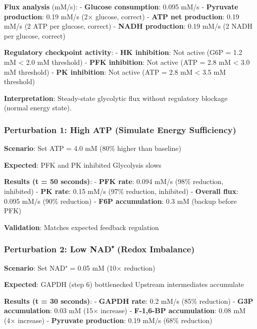 \textbf{Flux analysis} (mM/s): - \textbf{Glucose consumption}: 0.095
mM/s - \textbf{Pyruvate production}: 0.19 mM/s (2× glucose, correct) -
\textbf{ATP net production}: 0.19 mM/s (2 ATP per glucose, correct) -
\textbf{NADH production}: 0.19 mM/s (2 NADH per glucose, correct)

\textbf{Regulatory checkpoint activity}: - \textbf{HK inhibition}: Not
active (G6P = 1.2 mM \textless{} 2.0 mM threshold) - \textbf{PFK
inhibition}: Not active (ATP = 2.8 mM \textless{} 3.0 mM threshold) -
\textbf{PK inhibition}: Not active (ATP = 2.8 mM \textless{} 3.5 mM
threshold)

\textbf{Interpretation}: Steady-state glycolytic flux without regulatory
blockage (normal energy state).

\hypertarget{perturbation-1-high-atp-simulate-energy-sufficiency}{%
\subsubsection{Perturbation 1: High ATP (Simulate Energy
Sufficiency)}\label{perturbation-1-high-atp-simulate-energy-sufficiency}}

\textbf{Scenario}: Set ATP = 4.0 mM (80\% higher than baseline)

\textbf{Expected}: PFK and PK inhibited \textrightarrow Glycolysis slows

\textbf{Results (t = 50 seconds)}: - \textbf{PFK rate}: 0.094 
mM/s (98\% reduction, inhibited) - \textbf{PK rate}: 0.15  mM/s
(97\% reduction, inhibited) - \textbf{Overall flux}: 0.095  mM/s
(90\% reduction) - \textbf{F6P accumulation}: 0.3  mM (backup
before PFK)

\textbf{Validation}: Matches expected feedback regulation \checkmark

\hypertarget{perturbation-2-low-nad-redox-imbalance}{%
\subsubsection{Perturbation 2: Low NAD⁺ (Redox
Imbalance)}\label{perturbation-2-low-nad-redox-imbalance}}

\textbf{Scenario}: Set NAD⁺ = 0.05 mM (10× reduction)

\textbf{Expected}: GAPDH (step 6) bottlenecked \textrightarrow Upstream intermediates
accumulate

\textbf{Results (t = 30 seconds)}: - \textbf{GAPDH rate}: 0.2 
mM/s (85\% reduction) - \textbf{G3P accumulation}: 0.03  mM (15×
increase) - \textbf{F-1,6-BP accumulation}: 0.08  mM (4× increase)
- \textbf{Pyruvate production}: 0.19  mM/s (68\% reduction)

